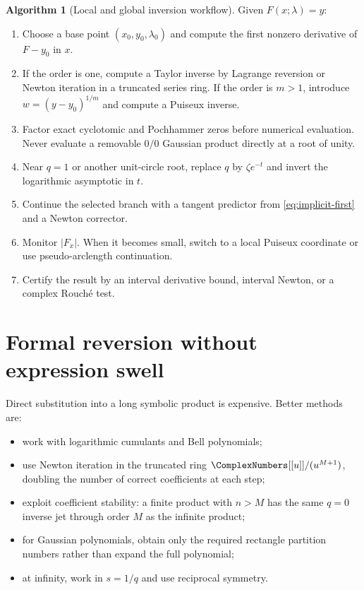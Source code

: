 \documentclass[11pt,oneside]{book}
\theoremstyle{definition}
\newtheorem{algorithm}[theorem]{Algorithm}
\theoremstyle{remark}
\begin{document}
\begin{algorithm}[Local and global inversion workflow]\label{alg:workflow}
Given $F(x;\lambda)=y$:
\begin{enumerate}
\item Choose a base point $(x_0,y_0,\lambda_0)$ and compute the first nonzero
      derivative of $F-y_0$ in $x$.
\item If the order is one, compute a Taylor inverse by Lagrange reversion or
      Newton iteration in a truncated series ring.  If the order is $m>1$,
      introduce $w=(y-y_0)^{1/m}$ and compute a Puiseux inverse.
\item Factor exact cyclotomic and Pochhammer zeros before numerical evaluation.
      Never evaluate a removable $0/0$ Gaussian product directly at a root of
      unity.
\item Near $q=1$ or another unit-circle root, replace $q$ by
      $\zeta e^{-t}$ and invert the logarithmic asymptotic in $t$.
\item Continue the selected branch with a tangent predictor from
      \eqref{eq:implicit-first} and a Newton corrector.
\item Monitor $|F_x|$.  When it becomes small, switch to a local Puiseux
      coordinate or use pseudo-arclength continuation.
\item Certify the result by an interval derivative bound, interval Newton, or
      a complex Rouch\'e test.
\end{enumerate}
\end{algorithm}

\section{Formal reversion without expression swell}
Direct substitution into a long symbolic product is expensive.  Better
methods are:
\begin{itemize}
\item work with logarithmic cumulants and Bell polynomials;
\item use Newton iteration in the truncated ring
      $\ComplexNumbers[[u]]/(u^{M+1})$, doubling the number of correct coefficients at each
      step;
\item exploit coefficient stability: a finite product with $n>M$ has the same
      $q=0$ inverse jet through order $M$ as the infinite product;
\item for Gaussian polynomials, obtain only the required rectangle partition
      numbers rather than expand the full polynomial;
\item at infinity, work in $s=1/q$ and use reciprocal symmetry.
\end{itemize}
\end{document}
